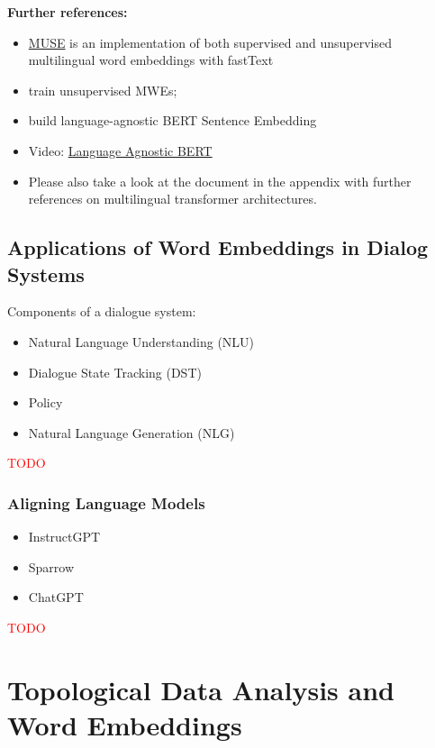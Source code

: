 \documentclass[11pt, a4paper]{amsart}
\begin{document}
\textbf{Further references:}
\begin{itemize}
	\item \href{https://github.com/facebookresearch/MUSE}{MUSE} is an implementation of both supervised and unsupervised multilingual word embeddings with fastText
	\item \cite{DBLP:journals/corr/abs-1808-08933} train unsupervised MWEs;
	\item \cite{DBLP:journals/corr/abs-2007-01852} build language-agnostic BERT Sentence Embedding
    \item Video: \href{https://youtu.be/7tAWk_Coj-s}{Language Agnostic BERT}
    \item Please also take a look at the document in the appendix with further references on multilingual transformer architectures.
\end{itemize}

\subsection{Applications of Word Embeddings in Dialog Systems}

Components of a dialogue system:
\begin{itemize}
	\item Natural Language Understanding (NLU)
	\item Dialogue State Tracking (DST)
	\item Policy
	\item Natural Language Generation (NLG)
\end{itemize}

\textcolor{red}{TODO}


\subsubsection{Aligning Language Models}

\begin{itemize}
	\item InstructGPT  \cite{ouyang2022training}
	\item Sparrow
	\item ChatGPT
\end{itemize}

\textcolor{red}{TODO}

\section{Topological Data Analysis and Word Embeddings}
\end{document}
